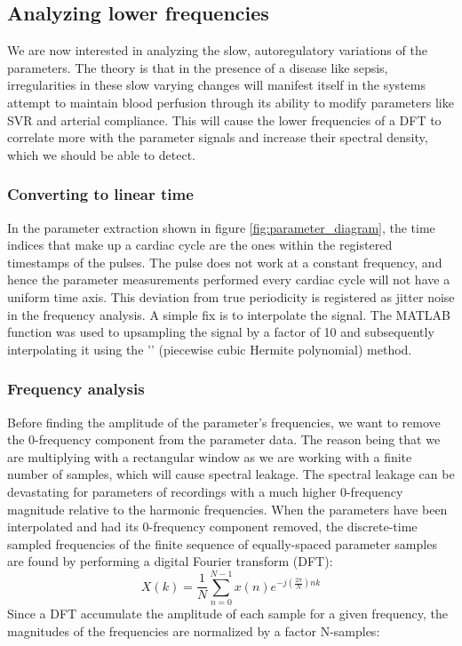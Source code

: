 \newpage



\subsection{Analyzing lower frequencies}

We are now interested in analyzing the slow, autoregulatory variations of the parameters. The theory is that in the presence of a disease like sepsis, irregularities in these slow varying changes will manifest itself in the systems attempt to maintain blood perfusion through its ability to modify parameters like SVR and arterial compliance. This will cause the lower frequencies of a DFT to correlate more with the parameter signals and increase their spectral density, which we should be able to detect.

\subsubsection{Converting to linear time}

In the parameter extraction shown in figure \ref{fig:parameter_diagram}, the time indices that make up a cardiac cycle are the ones within the registered timestamps of the pulses. The pulse does not work at a constant frequency, and hence the parameter measurements performed every cardiac cycle will not have a uniform time axis. This deviation from true periodicity is registered as jitter noise in the frequency analysis. A simple fix is to interpolate the signal. The MATLAB function  was used to upsampling the signal by a factor of 10 and subsequently interpolating it using the '' (piecewise cubic Hermite polynomial) method.

\subsubsection{Frequency analysis}

Before finding the amplitude of the parameter's frequencies, we want to remove the 0-frequency component from the parameter data. The reason being that we are multiplying with a rectangular window as we are working with a finite number of samples, which will cause spectral leakage. The spectral leakage can be devastating for parameters of recordings with a much higher 0-frequency magnitude relative to the harmonic frequencies. When the parameters have been interpolated and had its 0-frequency component removed, the discrete-time sampled frequencies of the finite sequence of equally-spaced parameter samples are found by performing a digital Fourier transform (DFT): 
\begin{equation}
    X(k) = \frac{1}{N}\sum_{n=0}^{N-1} x(n)e^{-j(\frac{2\pi}{N})nk} 
    \label{eq:DFT}
\end{equation}
Since a DFT accumulate the amplitude of each sample for a given frequency, the magnitudes of the frequencies are normalized by a factor N-samples:


